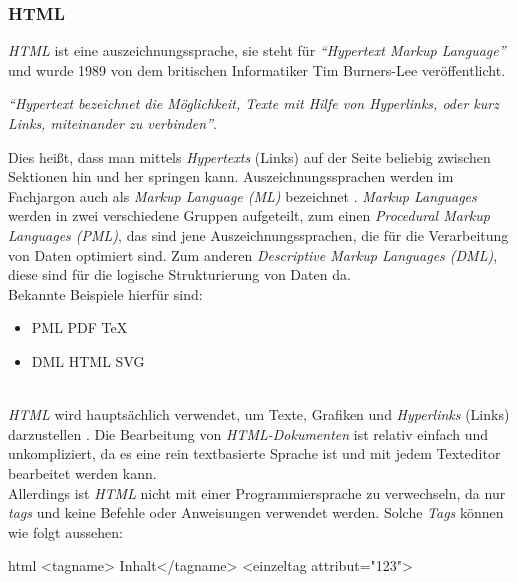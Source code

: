 		\subsubsection{HTML}
		\label{chapter:study-frontend-html}
		\textit{HTML} ist eine \Gls{auszeichnungssprache}, sie steht für \textit{\enquote{Hypertext Markup Language}} und wurde 1989 von dem britischen Informatiker Tim Burners-Lee veröffentlicht.\\ 
		\begin{center}
			\textit{\enquote{\textit{Hypertext} bezeichnet die Möglichkeit, Texte mit Hilfe von Hyperlinks, oder kurz Links, miteinander zu verbinden}}\cite{html5-css3-def}.
		\end{center}
		Dies heißt, dass man mittels \textit{Hypertexts} (Links) auf der Seite beliebig zwischen Sektionen hin und her springen kann.
		Auszeichnungssprachen werden im Fachjargon auch als \textit{Markup Language (ML)} bezeichnet \cite{auszeichnungssprachen}. \textit{Markup Languages} werden in zwei verschiedene Gruppen aufgeteilt, zum einen \textit{Procedural Markup Languages (PML)}, das sind jene Auszeichnungssprachen, die für die Verarbeitung von Daten optimiert sind. Zum anderen \textit{Descriptive Markup Languages (DML)}, diese sind für die logische Strukturierung von Daten da.\\Bekannte Beispiele hierfür sind:
		\begin{itemize}
		\item PML
		\subitem PDF
		\subitem TeX
		\item DML
		\subitem HTML
		\subitem SVG
		\end{itemize}
	\label{list:dmlbsp}~\\
		\textit{HTML} wird hauptsächlich verwendet, um Texte, Grafiken und \textit{Hyperlinks} (Links) darzustellen \cite{html5-css3-handbuch, html5-css3-def}. Die Bearbeitung von \textit{HTML-Dokumenten} ist relativ einfach und unkompliziert, da es eine rein textbasierte Sprache ist und mit jedem Texteditor bearbeitet werden kann.\\
		Allerdings ist \textit{HTML} nicht mit einer Programmiersprache zu verwechseln, da nur \textit{\Gls{tag}s} und keine Befehle oder Anweisungen verwendet werden. Solche \textit{Tags} können wie folgt aussehen:
		\begin{code}{html}
			<tagname> Inhalt</tagname>
			<einzeltag attribut="123">
		\end{code}
	\label{list:htmltags} ~\\

